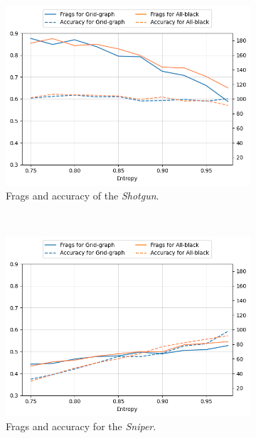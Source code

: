 \begin{figure}[hbtp]
\centering
    \begin{subfigure}[t]{0.45\linewidth}
\includegraphics[width=\linewidth]{Images/images/experiment_diff/shotgun_diff_final.png}
\caption{Frags and accuracy of the \textit{Shotgun}.}
\label{fig:ex_diff_entropy_shotgun}
	\end{subfigure}
	~
\centering
    \begin{subfigure}[t]{0.45\linewidth}
\includegraphics[width=\linewidth]{Images/images/experiment_diff/sniper_diff_final.png}
\caption{Frags and accuracy for the \textit{Sniper}.}
\label{fig:ex_diff_entropy_sniper}
	\end{subfigure}
	~
\centering
    \begin{subfigure}[t]{0.45\linewidth}

\end{subfigure}
\end{figure}
